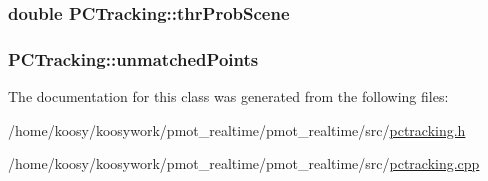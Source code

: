 \hypertarget{class_p_c_tracking_ae1cfc4fbb5c35558ff52ac6b5c9140bb}{
\subsubsection[{thr\-Prob\-Scene}]{\setlength{\rightskip}{0pt plus 5cm}double {\bf \-P\-C\-Tracking\-::thr\-Prob\-Scene}}}\label{class_p_c_tracking_ae1cfc4fbb5c35558ff52ac6b5c9140bb}
\hypertarget{class_p_c_tracking_ade7cb8fd4d872bb9eda66ae2f1a264be}{
\subsubsection[{unmatched\-Points}]{ {\bf \-P\-C\-Tracking\-::unmatched\-Points}}}\label{class_p_c_tracking_ade7cb8fd4d872bb9eda66ae2f1a264be}


\-The documentation for this class was generated from the following files\-:\begin{DoxyCompactItemize}
\item 
/home/koosy/koosywork/pmot\-\_\-realtime/pmot\-\_\-realtime/src/\hyperlink{pctracking_8h}{pctracking.\-h}\item 
/home/koosy/koosywork/pmot\-\_\-realtime/pmot\-\_\-realtime/src/\hyperlink{pctracking_8cpp}{pctracking.\-cpp}\end{DoxyCompactItemize}
